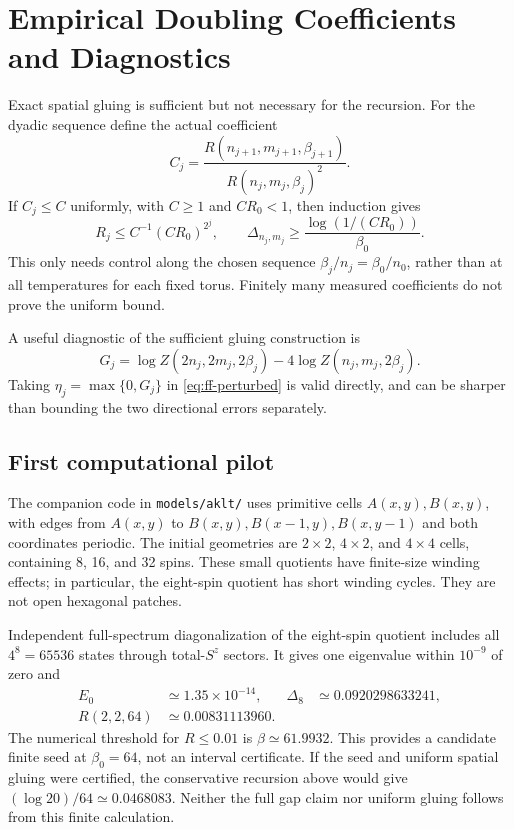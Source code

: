 \documentclass[11pt]{article}
\begin{document}
\section{Empirical Doubling Coefficients and Diagnostics}

Exact spatial gluing is sufficient but not necessary for the recursion.
For the dyadic sequence define the actual coefficient
\begin{equation}
	C_j=\frac{R(n_{j+1},m_{j+1},\beta_{j+1})}
	{R(n_j,m_j,\beta_j)^2}.
	\label{eq:actual-C}
\end{equation}
If \(C_j\le C\) uniformly, with \(C\ge1\) and \(CR_0<1\), then
induction gives
\[
	R_j\le C^{-1}(CR_0)^{2^j},\qquad
	\Delta_{n_j,m_j}\ge\frac{\log(1/(CR_0))}{\beta_0}.
\]
This only needs control along the chosen sequence
\(\beta_j/n_j=\beta_0/n_0\), rather than at all temperatures for
each fixed torus. Finitely many measured coefficients do not prove the
uniform bound.

A useful diagnostic of the sufficient gluing construction is
\[
	G_j=\log Z(2n_j,2m_j,2\beta_j)
	-4\log Z(n_j,m_j,2\beta_j).
\]
Taking \(\eta_j=\max\{0,G_j\}\) in
\eqref{eq:ff-perturbed} is valid directly, and can be sharper than
bounding the two directional errors separately.

\subsection{First computational pilot}

The companion code in \texttt{models/aklt/} uses primitive cells
\(A(x,y),B(x,y)\), with edges from \(A(x,y)\) to
\(B(x,y),B(x-1,y),B(x,y-1)\) and both coordinates periodic.
The initial geometries are \(2\times2\), \(4\times2\), and
\(4\times4\) cells, containing 8, 16, and 32 spins. These small
quotients have finite-size winding effects; in particular, the
eight-spin quotient has short winding cycles. They are not open
hexagonal patches.

Independent full-spectrum diagonalization of the eight-spin quotient
includes all \(4^8=65536\) states through total-\(S^z\) sectors.
It gives one eigenvalue within \(10^{-9}\) of zero and
\begin{align*}
	E_0       & \simeq1.35\times10^{-14}, &
	\Delta_8  & \simeq0.0920298633241,      \\
	R(2,2,64) & \simeq0.00831113960.      &
\end{align*}
The numerical threshold for \(R\le0.01\) is
\(\beta\simeq61.9932\). This provides a candidate finite seed at
\(\beta_0=64\), not an interval certificate. If the seed and uniform
spatial gluing were certified, the conservative recursion above would
give \((\log20)/64\simeq0.0468083\). Neither the full gap claim nor
uniform gluing follows from this finite calculation.
\end{document}
